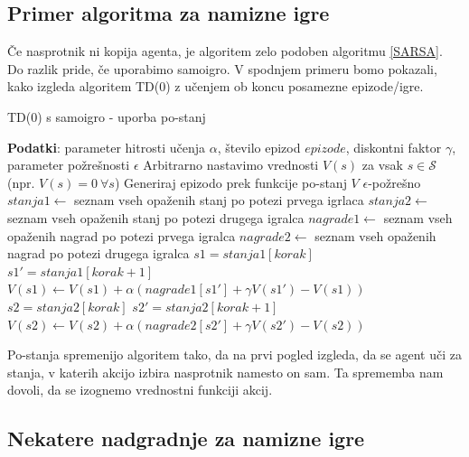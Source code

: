 \documentclass[12pt,a4paper]{amsart}
\theoremstyle{definition} %
\theoremstyle{plain} %
\begin{document}
\subsection{Primer algoritma za namizne igre}
Če nasprotnik ni kopija agenta, je algoritem zelo podoben algoritmu \ref{SARSA}. Do razlik pride, če uporabimo 
samoigro. V spodnjem primeru bomo pokazali, kako izgleda algoritem TD($0$) z učenjem ob koncu posamezne 
epizode/igre.

\begin{algorithm}[H]
    \caption{TD($0$) s samoigro - uporba po-stanj}
\begin{algorithmic}
    \STATE \textbf{Podatki}: parameter hitrosti učenja $\alpha$, število epizod $epizode$, diskontni 
            faktor $\gamma$, parameter požrešnosti $\epsilon$
    \STATE 
    \STATE Arbitrarno nastavimo vrednosti $V(s)$ za vsak $s \in \mathcal{S}$ (npr. $V(s) = 0~\forall s$)
    \STATE
        \STATE Generiraj epizodo prek funkcije po-stanj $V$ $\epsilon$-požrešno
        \STATE $stanja1 \leftarrow$ seznam vseh opaženih stanj po potezi prvega igrlaca
        \STATE $stanja2 \leftarrow$ seznam vseh opaženih stanj po potezi drugega igralca
        \STATE $nagrade1 \leftarrow$ seznam vseh opaženih nagrad po potezi prvega igralca
        \STATE $nagrade2 \leftarrow$ seznam vseh opaženih nagrad po potezi drugega igralca
        \STATE
                \STATE $s1 = stanja1[korak]$
                \STATE $s1' = stanja1[korak + 1]$
                \STATE $V(s1) \leftarrow V(s1) + \alpha (nagrade1[s1'] + \gamma V(s1') - V(s1))$ 
            \ELSE
                \STATE $s2 = stanja2[korak]$
                \STATE $s2' = stanja2[korak + 1]$
                \STATE $V(s2) \leftarrow V(s2) + \alpha (nagrade2[s2'] + \gamma V(s2') - V(s2))$ 
            \ENDIF
        \ENDFOR
    \ENDFOR
\end{algorithmic}
\end{algorithm}

Po-stanja spremenijo algoritem tako, da na prvi pogled izgleda, da se agent uči za stanja, v katerih 
akcijo izbira nasprotnik namesto on sam. Ta sprememba nam dovoli, da se izognemo vrednostni funkciji 
akcij.


\subsection{Nekatere nadgradnje za namizne igre}
\end{document}
